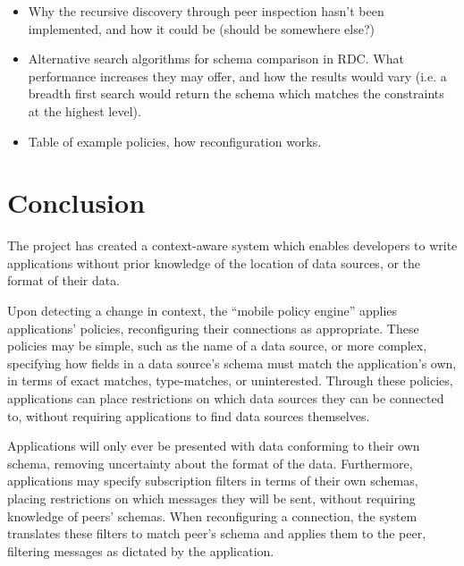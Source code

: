 \documentclass[12pt,twoside,notitlepage]{report}
\begin{document}
\begin{itemize}
\item Why the recursive discovery through peer inspection hasn't been implemented, and how it could be (should be somewhere else?)

\item Alternative search algorithms for schema comparison in RDC. What performance increases they may offer, and how the results would vary (i.e. a breadth first search would return the schema which matches the constraints at the highest level).

\item Table of example policies, how reconfiguration works.
\end{itemize}


\cleardoublepage

\chapter{Conclusion}

The project has created a context-aware system which enables developers to write applications without prior knowledge of the location of data sources, or the format of their data. 

Upon detecting a change in context, the ``mobile policy engine'' applies applications' policies, reconfiguring their connections as appropriate. 
These policies may be simple, such as the name of a data source, or more complex, specifying how fields in a data source's schema must match the application's own, in terms of exact matches, type-matches, or uninterested. 
Through these policies, applications can place restrictions on which data sources they can be connected to, without requiring applications to find data sources themselves.

Applications will only ever be presented with data conforming to their own schema, removing uncertainty about the format of the data.
Furthermore, applications may specify subscription filters in terms of their own schemas, placing restrictions on which messages they will be sent, without requiring knowledge of peers' schemas.
When reconfiguring a connection, the system translates these filters to match peer's schema and applies them to the peer, filtering messages as dictated by the application.
\end{document}
